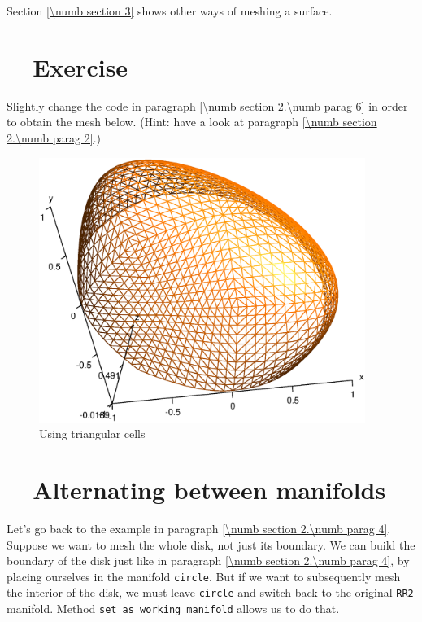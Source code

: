 Section \ref{\numb section 3} shows other ways of meshing a surface.


\section{~~Exercise}\label{\numb section 2.\numb parag 7}

Slightly change the code in paragraph \ref{\numb section 2.\numb parag 6}
in order to obtain the mesh below.
(Hint: have a look at paragraph \ref{\numb section 2.\numb parag 2}.)

\begin{figure}[ht] \centering
  \includegraphics[width=106mm]{hemisphere-1}
  \caption{Using triangular cells}
  \label{\numb section 2.\numb fig 7}
\end{figure}


\section{~~Alternating between manifolds}\label{\numb section 2.\numb parag 8}

Let's go back to the example in paragraph \ref{\numb section 2.\numb parag 4}.
Suppose we want to mesh the whole disk, not just its boundary.
We can build the boundary of the disk just like in paragraph
\ref{\numb section 2.\numb parag 4}, by placing ourselves in the manifold {\small\tt circle}.
But if we want to subsequently mesh the interior of the disk, we must leave {\small\tt circle}
and switch back to the original {\small\tt RR2} manifold.
Method {\small\tt set\_as\_working\_manifold} allows us to do that.

